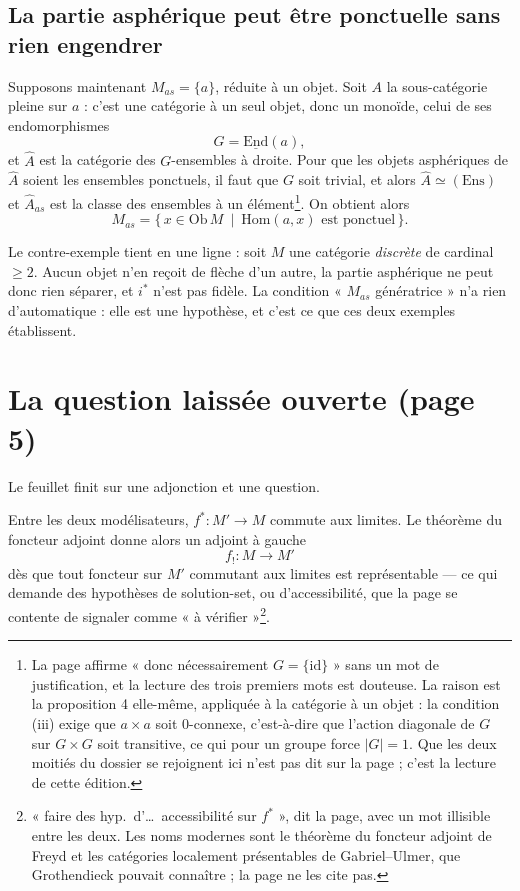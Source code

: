 \documentclass[11pt,a4paper]{article}
\begin{document}
\subsection*{La partie asphérique peut être ponctuelle sans rien engendrer}

Supposons maintenant $M_{as} = \{a\}$, réduite à un objet. Soit $A$ la
sous-catégorie pleine sur $a$ : c'est une catégorie à un seul objet, donc un
monoïde, celui de ses endomorphismes
\[
G = \underline{\mathrm{End}}(a),
\]
et $\hat{A}$ est la catégorie des $G$-ensembles à droite. Pour que les objets
asphériques de $\hat{A}$ soient les ensembles ponctuels, il faut que $G$ soit
trivial, et alors $\hat{A} \simeq (\mathrm{Ens})$ et $\hat{A}_{as}$ est la classe
des ensembles à un élément\footnote{La page affirme « donc nécessairement
$G = \{\mathrm{id}\}$ » sans un mot de justification, et la lecture des trois
premiers mots est douteuse. La raison est la proposition 4 elle-même, appliquée
à la catégorie à un objet : la condition (iii) exige que $a \times a$ soit
$0$-connexe, c'est-à-dire que l'action diagonale de $G$ sur $G \times G$ soit
transitive, ce qui pour un groupe force $|G| = 1$. Que les deux moitiés du
dossier se rejoignent ici n'est pas dit sur la page ; c'est la lecture de cette
édition.}. On obtient alors
\[
M_{as} = \{\, x \in \mathrm{Ob}\,M \ \mid \ \mathrm{Hom}(a, x)
\text{ est ponctuel} \,\}.
\]

Le contre-exemple tient en une ligne : soit $M$ une catégorie \emph{discrète} de
cardinal $\geq 2$. Aucun objet n'en reçoit de flèche d'un autre, la partie
asphérique ne peut donc rien séparer, et $i^{*}$ n'est pas fidèle. La condition
« $M_{as}$ génératrice » n'a rien d'automatique : elle est une hypothèse, et
c'est ce que ces deux exemples établissent.

\section*{La question laissée ouverte (page 5)}

Le feuillet finit sur une adjonction et une question.

Entre les deux modélisateurs, $f^{*} : M' \to M$ commute aux limites. Le
théorème du foncteur adjoint donne alors un adjoint à gauche
\[
f_{!} : M \longrightarrow M'
\]
dès que tout foncteur sur $M'$ commutant aux limites est représentable — ce qui
demande des hypothèses de solution-set, ou d'accessibilité, que la page se
contente de signaler comme « à vérifier »\footnote{« faire des hyp.\ d'\ldots\
accessibilité sur $f^{*}$ », dit la page, avec un mot illisible entre les deux.
Les noms modernes sont le théorème du foncteur adjoint de Freyd et les
catégories localement présentables de Gabriel--Ulmer, que Grothendieck pouvait
connaître ; la page ne les cite pas.}.
\end{document}
